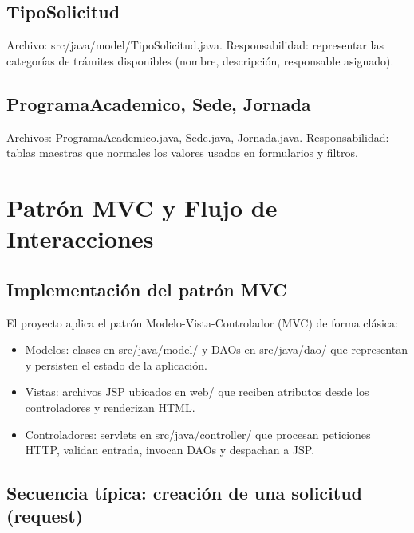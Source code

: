 \documentclass[12pt,letterpaper]{article}
\newcommand{\code}[1]{\texorpdfstring{\begingroup\normalfont\normalsize\def\_{\textunderscore\allowbreak}#1\endgroup}{#1}}
\begin{document}
\subsection*{TipoSolicitud}
Archivo: \code{src/java/model/TipoSolicitud.java}.
Responsabilidad: representar las categorías de trámites disponibles (nombre, descripción, responsable asignado).

\subsection*{ProgramaAcademico, Sede, Jornada}
Archivos: \code{ProgramaAcademico.java}, \code{Sede.java}, \code{Jornada.java}.
Responsabilidad: tablas maestras que normales los valores usados en formularios y filtros.

\section{Patrón MVC y Flujo de Interacciones}

\subsection{Implementación del patrón MVC}

El proyecto aplica el patrón Modelo-Vista-Controlador (MVC) de forma clásica:

\begin{itemize}
    \item Modelos: clases en \code{src/java/model/} y DAOs en \code{src/java/dao/} que representan y persisten el estado de la aplicación.
    \item Vistas: archivos JSP ubicados en \code{web/} que reciben atributos desde los controladores y renderizan HTML.
    \item Controladores: servlets en \code{src/java/controller/} que procesan peticiones HTTP, validan entrada, invocan DAOs y despachan a JSP.
\end{itemize}

\subsection{Secuencia típica: creación de una solicitud (request)}
\end{document}
